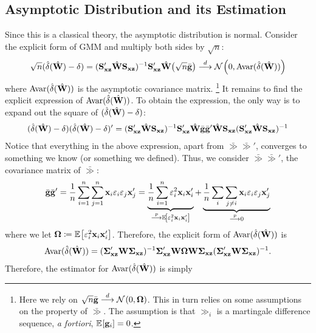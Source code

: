 \documentclass{article}
\begin{document}
\subsection{Asymptotic Distribution and its Estimation}

Since this is a classical theory, the asymptotic distribution is normal.
Consider the explicit form of GMM  and multiply
both sides by $\sqrt{n}$:
\begin{align*}
	\sqrt{n}(\hat{\delta}(\hat{\mathbf{W}}) - \delta)
	= (\mathbf{S}_{\mathbf{x}\mathbf{z}}'\hat{\mathbf{W}}\mathbf{S}_{\mathbf{x}\mathbf{z}})^{-1}\mathbf{S}_{\mathbf{x}\mathbf{z}}'\hat{\mathbf{W}}\big(\sqrt{n}\bar{\mathbf{g}}\big)
	\overset{d}{\longrightarrow} \mathcal{N}_{}\left(0,\mathrm{Avar}(\hat{\delta}(\hat{\mathbf{W}}))\right)
\end{align*}
where $\mathrm{Avar}(\hat{\delta}(\hat{\mathbf{W}}))$ is the asymptotic covariance matrix.
	\footnote{Here we rely on $\sqrt{n}\bar{\mathbf{g}}\overset{d}{\longrightarrow}\mathcal{N}_{}\left(0,\boldsymbol{\Omega}\right)$.
	This in turn relies on some assumptions on the property of $\bar{\gg}$.
	The assumption is that $\gg_i$ is a martingale difference sequence,
	\emph{a fortiori}, $\operatorname{\mathbb{E}}_{}\!\left[\mathbf{g}_i\right]=0$.
	}
It remains to find the explicit expression of $\mathrm{Avar}(\hat{\delta}(\hat{\mathbf{W}}))$.
To obtain the expression, the only way is to expand out the square of
$(\hat{\delta}(\hat{\mathbf{W}})-\delta)$:
\begin{align*}
	(\hat{\delta}(\hat{\mathbf{W}})-\delta)(\hat{\delta}(\hat{\mathbf{W}})-\delta)'
	= (\mathbf{S}_{\mathbf{x}\mathbf{z}}'\hat{\mathbf{W}}\mathbf{S}_{\mathbf{x}\mathbf{z}})^{-1}\mathbf{S}_{\mathbf{x}\mathbf{z}}'\hat{\mathbf{W}}
	\bar{\mathbf{g}}\bar{\mathbf{g}}'
	\hat{\mathbf{W}}\mathbf{S}_{\mathbf{x}\mathbf{z}}(\mathbf{S}_{\mathbf{x}\mathbf{z}}'\hat{\mathbf{W}}\mathbf{S}_{\mathbf{x}\mathbf{z}})^{-1}
\end{align*}
Notice that everything in the above expression, apart from $\bar{\gg}\bar{\gg}'$,
converges to something we know (or something we defined).
Thus, we consider $\bar{\gg}\bar{\gg}'$, the covariance matrix of $\bar{\gg}$:
\begin{align*}
	\bar{\mathbf{g}}\bar{\mathbf{g}}'
	= \frac1n \sum_{i=1}^{n}\sum_{j=1}^{n} \mathbf{x}_i\varepsilon_i\varepsilon_j\mathbf{x}_j'
	= \underbrace{\frac1n \sum_{i=1}^{n} \varepsilon_i^2\mathbf{x}_i\mathbf{x}_i'}_{\overset{p}{\longrightarrow}\operatorname{\mathbb{E}}_{}\!\left[\varepsilon_i^2\mathbf{x}_i\mathbf{x}_i'\right]}
	+ \underbrace{\frac1n \sum_{i}\sum_{j\neq i} \mathbf{x}_i\varepsilon_i\varepsilon_j\mathbf{x}_j'}_{\overset{p}{\longrightarrow}0}
\end{align*}
where we let $\boldsymbol{\Omega}\coloneqq\operatorname{\mathbb{E}}_{}\!\left[\varepsilon_i^2\mathbf{x}_i\mathbf{x}_i'\right]$.
Therefore, the explicit form of $\mathrm{Avar}(\hat{\delta}(\hat{\mathbf{W}}))$ is
\begin{align*}
	\mathrm{Avar}(\hat{\delta}(\hat{\mathbf{W}}))
	= (\boldsymbol{\Sigma}_{\mathbf{x}\mathbf{z}}'\mathbf{W}\boldsymbol{\Sigma}_{\mathbf{x}\mathbf{z}})^{-1}
	\boldsymbol{\Sigma}_{\mathbf{x}\mathbf{z}}'\mathbf{W}\boldsymbol{\Omega}\mathbf{W}\boldsymbol{\Sigma}_{\mathbf{x}\mathbf{z}}
	(\boldsymbol{\Sigma}_{\mathbf{x}\mathbf{z}}'\mathbf{W}\boldsymbol{\Sigma}_{\mathbf{x}\mathbf{z}})^{-1}.
\end{align*}
Therefore, the estimator for $\mathrm{Avar}(\hat{\delta}(\hat{\mathbf{W}}))$ is simply
\end{document}
